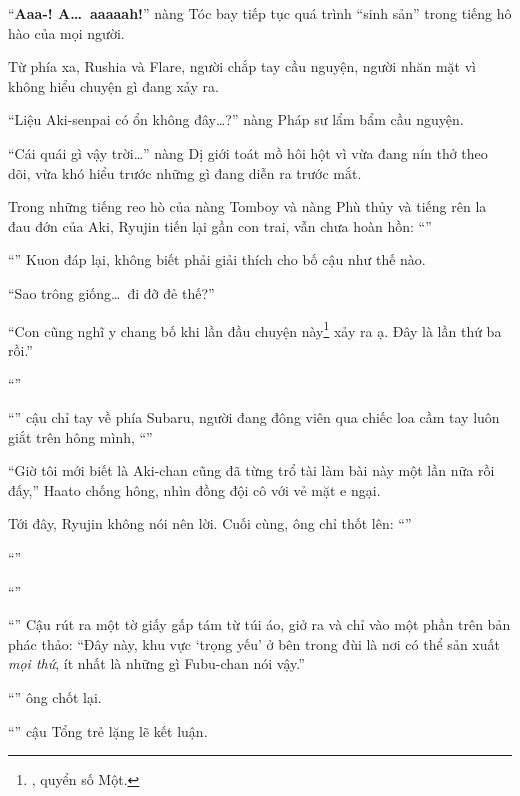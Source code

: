 \documentclass[../main.tex]{subfiles}
\begin{document}
``\textbf{Aaa-! A\dots\ aaaaah!}'' nàng Tóc bay tiếp tục quá trình ``sinh sản'' trong tiếng hô hào của mọi người.

Từ phía xa, Rushia và Flare, người chắp tay cầu nguyện, người nhăn mặt vì không hiểu chuyện gì đang xảy ra.

``Liệu Aki-senpai có ổn không đây\dots?'' nàng Pháp sư lẩm bẩm cầu nguyện.

``Cái quái gì vậy trời\dots'' nàng Dị giới toát mồ hôi hột vì vừa đang nín thở theo dõi, vừa khó hiểu trước những gì đang diễn ra trước mắt.

Trong những tiếng reo hò của nàng Tomboy và nàng Phù thủy và tiếng rên la đau đớn của Aki, Ryujin tiến lại gần con trai, vẫn chưa hoàn hồn: ``''

``'' Kuon đáp lại, không biết phải giải thích cho bố cậu như thế nào.

``Sao trông giống\dots\ đi đỡ đẻ thế?''

``Con cũng nghĩ y chang bố khi lần đầu chuyện này\footnote{, quyển số Một.} xảy ra ạ. Đây là lần thứ ba rồi.''

``''

``'' cậu chỉ tay về phía Subaru, người đang đông viên qua chiếc loa cầm tay luôn giắt trên hông mình, ``''

``Giờ tôi mới biết là Aki-chan cũng đã từng trổ tài làm bài này một lần nữa rồi đấy,'' Haato chống hông, nhìn đồng đội cô với vẻ mặt e ngại.

Tới đây, Ryujin không nói nên lời. Cuối cùng, ông chỉ thốt lên: ``''

``''

``''

``'' Cậu rút ra một tờ giấy gấp tám từ túi áo, giở ra và chỉ vào một phần trên bản phác thảo: ``Đây này, khu vực `trọng yếu' ở bên trong đùi là nơi có thể sản xuất \emph{mọi thứ}, ít nhất là những gì Fubu-chan nói vậy.''


``'' ông chốt lại.

``'' cậu Tổng trẻ lặng lẽ kết luận.
\end{document}
